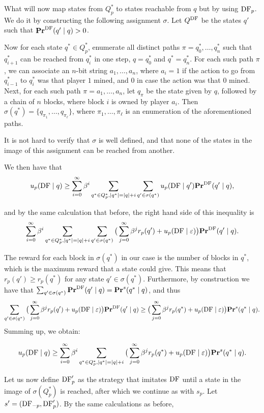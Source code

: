 What will now map states from $Q^*_p$ to states reachable from $q$ but by using $\text{\rm DF}_p$. We do it by constructing the following assignment $\sigma$.
Let $Q^{\text{\rm DF}}$ be the states $q'$ such that $\mathbf{Pr}^{\text{\rm DF}}(q' \mid q) > 0$. 

Now for each state $q^* \in Q^*_p$, enumerate all distinct paths $\pi = q^*_0,\dots,q_n^*$ such that $q_{i+1}^*$ can be reached from 
$q_i^*$ in one step, $q = q_0^*$ and $q^* = q_n^*$. For each such path $\pi$, we can associate an $n$-bit string $a_1,\dots,a_n$, 
where $a_i = 1$ if the action to go from $q_{i-1}^*$ to $q_i^*$ was that player $1$ mined, and $0$ in case the action was that $0$ mined. 
Next, for each such path $\pi = a_1,\dots,a_n$, let $q_\pi$ be the state given by $q$, followed by a chain of $n$ blocks, where block $i$ is 
owned by player $a_i$. Then $\sigma(q^*) = \{q_{\pi_1},\dots,q_{\pi_\ell}\}$, where $\pi_1,\dots,\pi_\ell$ is an enumeration of the aforementioned paths. 

It is not hard to verify that $\sigma$ is well defined, and that none of 
the states in the image of this assignment can be reached from another. 

We then have that 
$$u_p( \text{\rm DF} \mid q) \geq \sum_{i=0}^\infty \beta^i \sum_{q^* \in Q^*_p, |q^*| = |q| + i} \sum_{q' \in \sigma(q^*)} 
u_p(\text{\rm DF} \mid q')  \mathbf{Pr}^{\text{\rm DF}}(q' \mid q), $$

and by the same calculation that before, the right hand side of this inequality is 
$$\sum_{i=0}^\infty \beta^i \sum_{q^* \in Q^*_p, |q^*| = |q| + i} \sum_{q' \in \sigma(q^*)}  \big(\sum_{j = 0}^\infty \beta^j r_p(q') + u_p(\text{\rm DF} \mid \varepsilon)\big) \mathbf{Pr}^{\text{\rm DF}}(q' \mid q).$$

The reward for each block in $\sigma(q^*)$ in our case is the number of blocks in $q^*$, which is the maximum reward that a state could give. This means that $r_p(q') \geq r_p(q^*)$ for any state $q' \in \sigma(q^*)$. 
Furthermore,  by construction we have that 
$\sum_{q' \in \sigma(q^*)} \mathbf{Pr}^{\text{\rm DF}}(q' \mid q) = \mathbf{Pr}^s(q^* \mid q)$, and thus 
$$\sum_{q' \in \sigma(q^*)} \big(\sum_{j = 0}^\infty \beta^j r_p(q') + u_p(\text{\rm DF} \mid \varepsilon)\big) \mathbf{Pr}^{\text{\rm DF}}(q' \mid q) \geq \big(\sum_{j = 0}^\infty \beta^j r_p(q^*) + u_p(\text{\rm DF} \mid \varepsilon)\big) \mathbf{Pr}^s(q^* \mid q).$$ 
Summing up, we obtain: 

$$u_p( \text{\rm DF} \mid q) \geq \sum_{i=0}^\infty \beta^i \sum_{q^* \in Q^*_p, |q^*| = |q| + i} \big(\sum_{j = 0}^\infty \beta^j r_p(q^*) + u_p(\text{\rm DF} \mid \varepsilon)\big)  \mathbf{Pr}^s(q^* \mid q).$$

Let us now define $\text{\rm DF}'_p$ as the strategy that imitates $\text{\rm DF}$ until a state in the image of $\sigma(Q^*_p)$ is reached, after which 
we continue as with $s_p$. Let $s' = (\text{\rm DF}_{-p},\text{\rm DF}'_p)$. By the same calculations as before, 

